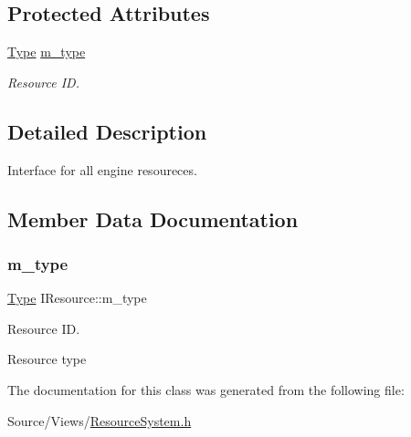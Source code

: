 \subsection*{Protected Attributes}
\begin{DoxyCompactItemize}
\item 
\mbox{\hyperlink{class_i_resource_a693b751055bf043ebcd424a89831397f}{Type}} \mbox{\hyperlink{class_i_resource_ada72a3487016b965f957c8d89555d84b}{m\+\_\+type}}
\begin{DoxyCompactList}\small\item\em Resource ID. \end{DoxyCompactList}\end{DoxyCompactItemize}


\subsection{Detailed Description}
Interface for all engine resoureces. 

\subsection{Member Data Documentation}
\mbox{\label{class_i_resource_ada72a3487016b965f957c8d89555d84b}} 
\subsubsection{\texorpdfstring{m\+\_\+type}{m\_type}}
{\footnotesize\ttfamily \mbox{\hyperlink{class_i_resource_a693b751055bf043ebcd424a89831397f}{Type}} I\+Resource\+::m\+\_\+type\hspace{0.3cm}{\ttfamily [protected]}}



Resource ID. 

Resource type 

The documentation for this class was generated from the following file\+:\begin{DoxyCompactItemize}
\item 
Source/\+Views/\mbox{\hyperlink{_resource_system_8h}{Resource\+System.\+h}}\end{DoxyCompactItemize}
